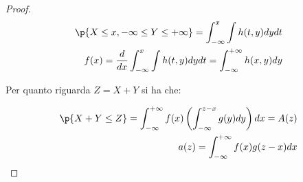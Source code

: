 \begin{defn}
\begin{proof}
        \begin{equation*}
            \begin{aligned}
                \p{X \leq x, -\infty \leq Y \leq +\infty} = \int_{-\infty}^{x} \int h(t, y) dy dt \\
                f(x) = \frac{d}{dx} \int_{-\infty}^{x} \int h(t, y) dy dt = \int_{-\infty}^{+\infty} h(x,y) dy
            \end{aligned}
        \end{equation*}

        Per quanto riguarda $Z = X + Y$ si ha che:

        \begin{equation*}
            \begin{aligned}
                \p{X + Y \leq Z} = \int_{-\infty}^{+\infty} f(x) \left( \int_{-\infty}^{z - x} g(y) dy \right) dx = A(z) \\
                a(z) = \int_{-\infty}^{+\infty} f(x) g(z - x) dx
            \end{aligned}
        \end{equation*}
    \end{proof}
\end{defn}

